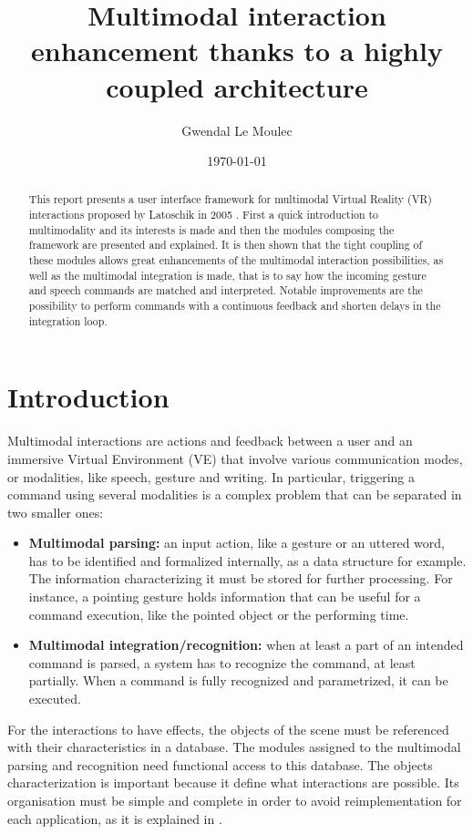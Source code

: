 \documentclass[a4paper]{article}
\title{Multimodal interaction enhancement thanks to a highly coupled architecture}
\author{Gwendal Le Moulec}
\date{\today}
\begin{document}
\maketitle

\begin{abstract}
This report presents a user interface framework for multimodal Virtual Reality (VR) interactions proposed by Latoschik in 2005 \cite{latoschik}. First a quick introduction to multimodality and its interests is made and then the modules composing the framework are presented and explained. It is then shown that the tight coupling of these modules allows great enhancements of the multimodal interaction possibilities, as well as the multimodal integration is made, that is to say how the incoming gesture and speech commands are matched and interpreted. Notable improvements are the possibility to perform commands with a continuous feedback and shorten delays in the integration loop.
\end{abstract}

\tableofcontents

\section{Introduction}

Multimodal interactions are actions and feedback between a user and an immersive Virtual Environment (VE) that involve various communication modes, or modalities, like speech, gesture and writing. In particular, triggering a command using several modalities is a complex problem that can be separated in two smaller ones:
\begin{itemize}
	\item \textbf{Multimodal parsing:} an input action, like a gesture or an uttered word, has to be identified and formalized internally, as a data structure for example. The information characterizing it must be stored for further processing. For instance, a pointing gesture holds information that can be useful for a command execution, like the pointed object or the performing time.
	\item \textbf{Multimodal integration/recognition:} when at least a part of an intended command is parsed, a system has to recognize the command, at least partially. When a command is fully recognized and parametrized, it can be executed.
\end{itemize}

For the interactions to have effects, the objects of the scene must be referenced with their characteristics in a database. The modules assigned to the multimodal parsing and recognition need functional access to this database. The objects characterization is important because it define what interactions are possible. Its organisation must be simple and complete in order to avoid reimplementation for each application, as it is explained in \cite{krl}.
\end{document}
